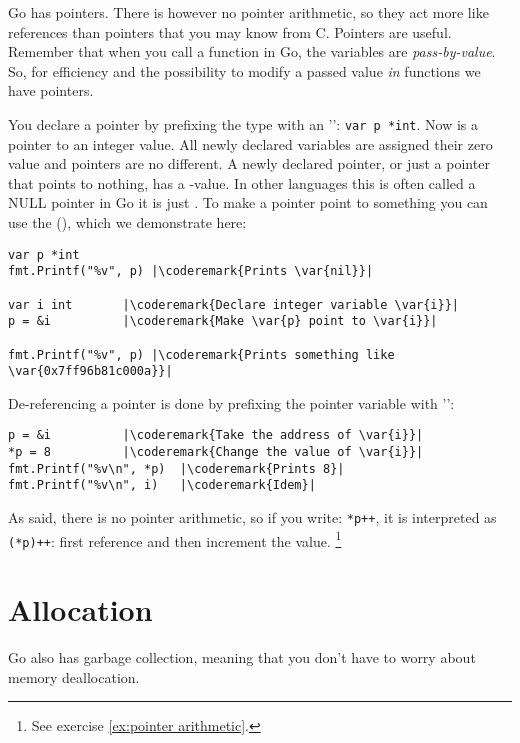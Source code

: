 \noindent{}
Go has pointers.
There is however no pointer arithmetic, so they act more like
references than pointers that you may know from C. Pointers 
are useful.
Remember that when you call a function in Go, the variables are
\emph{pass-by-value}. So, for efficiency and the possibility to modify a
passed value \emph{in} functions we have pointers.

You declare a pointer by prefixing the type with an
'\key{*}':
\lstinline{var p *int}. Now  is a pointer to an integer value.
All newly declared variables are assigned their zero value and pointers
are no different. A newly declared pointer, or just a pointer that points to
nothing, has a -value. In other languages this is often called
a NULL pointer in Go it is just . To make 
a pointer point to something you can use the 
(\func{\&}), which we demonstrate here:
\begin{lstlisting}[caption=Use of a pointer,label=src:pointers]
var p *int
fmt.Printf("%v", p) |\coderemark{Prints \var{nil}}|

var i int	    |\coderemark{Declare integer variable \var{i}}|
p = &i		    |\coderemark{Make \var{p} point to \var{i}}|

fmt.Printf("%v", p) |\coderemark{Prints something like \var{0x7ff96b81c000a}}|
\end{lstlisting}
De-referencing a pointer is done by prefixing the pointer variable with
'\type{*}':
\begin{lstlisting}[caption=Dereferencing a pointer,label=src:deref]
p = &i			|\coderemark{Take the address of \var{i}}|
*p = 8			|\coderemark{Change the value of \var{i}}|
fmt.Printf("%v\n", *p)  |\coderemark{Prints 8}|
fmt.Printf("%v\n", i)	|\coderemark{Idem}|
\end{lstlisting}

\label{main:pointer arithmetic}
As said, there is no pointer arithmetic, so if you write:
\lstinline{*p++}, it is interpreted as \lstinline{(*p)++}: first
reference and then increment the value.
\footnote{See exercise \ref{ex:pointer arithmetic}.}

\section{Allocation}
Go also has garbage collection, meaning that you don't have to worry about
memory deallocation. 

